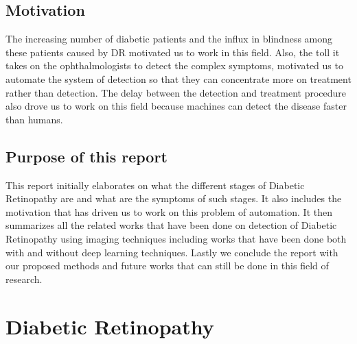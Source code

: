 \documentclass[12pt]{report}
\begin{document}
\section{Motivation}
The increasing number of diabetic patients and the influx in blindness among these
patients caused by DR motivated us to work in this field. Also, the toll it takes on
the ophthalmologists to detect the complex symptoms, motivated us to automate
the system of detection so that they can concentrate more on treatment rather than
detection. The delay between the detection and treatment procedure also drove us
to work on this field because machines can detect the disease faster than humans.
\section{Purpose of this report}
This report initially elaborates on what the different stages of Diabetic Retinopathy
are and what are the symptoms of such stages. It also includes the motivation
that has driven us to work on this problem of automation. It then summarizes all
the related works that have been done on detection of Diabetic Retinopathy using
imaging techniques including works that have been done both with and without deep
learning techniques. Lastly we conclude the report with our proposed methods and
future works that can still be done in this field of research.
\chapter{Diabetic Retinopathy}
\end{document}
